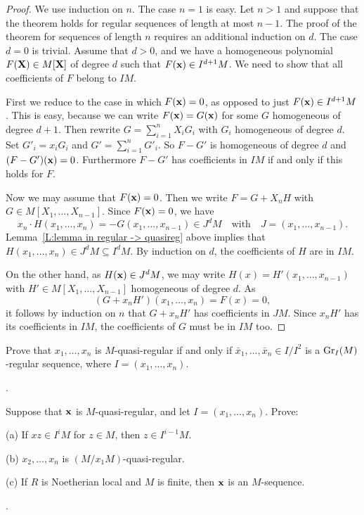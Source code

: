 	
	\begin{proof}
		We use induction on $n$. The case $n = 1$ is easy. Let $n > 1$ and suppose that the theorem holds for regular sequences of length at most $n-1$.
		The proof of the theorem for sequences of length $n$ requires an additional induction on $d$. The case $d = 0$ is trivial. Assume that $d > 0$, and we have a homogeneous polynomial $F(\mathbf{X}) \in M[\mathbf{X}]$ of degree $d$ such that $F(\mathbf{x}) \in I^{d+1}M$. We need to show that all coefficients of $F$ belong to $IM$.
		
		First we reduce to the case in which $F(\mathbf{x}) = 0$, as opposed to just $F(\mathbf{x}) \in I^{d+1}M$. This is easy, because we can write $F(\mathbf{x}) = G(\mathbf{x})$ for some $G$ homogeneous of degree $d+1$. Then rewrite $G = \sum_{i=1}^n X_iG_i$ with $G_i$ homogeneous of degree $d$. Set $G'_i = x_iG_i$ and $G' = \sum_{i=1}^n G'_i$. So $F - G'$ is homogeneous of degree $d$ and $(F - G')(\mathbf{x}) = 0$. Furthermore $F - G'$ has coefficients in $IM$ if and only if this holds for $F$.
		
		Now we may assume that $F(\mathbf{x}) = 0$. Then we write $F = G + X_nH$ with $G \in M[X_1, \dots, X_{n-1}]$.
		Since $F(\mathbf{x}) =0$, we have
		$$
		x_n \cdot H(x_1, \dots, x_n) = -G(x_1, \dots, x_{n-1}) \in J^d M \quad \textrm{with} \quad J = (x_1, \dots, x_{n-1}).
		$$
		Lemma~\ref{L:lemma in regular -> quasireg} above implies that $H(x_1, \dots,x_n) \in J^d M \subseteq I^d M$. By induction on $d$, the coefficients of $H$ are in $IM$.
		
		On the other hand, as $H(\mathbf{x}) \in J^dM$, we may write $H(x) = H'(x_1, \dots, x_{n-1})$ with $H' \in M[X_1, \dots, X_{n-1}]$ homogeneous of degree $d$. As
		\[(G + x_nH')(x_1, \dots, x_n) = F(x) = 0,\]
		it follows by induction on $n$ that $G + x_nH'$ has coefficients in $JM$. Since $x_nH'$ has its coefficients in $IM$, the coefficients of $G$ must be in $IM$ too.
	\end{proof}
	
	
	\begin{lemma}
		Prove that $x_1, \dots, x_n$ is $M$-quasi-regular if and only if $\bar x_1, \dots, \bar x_n\in I/I^2$ is a $\mathrm{Gr}_I(M)$-regular sequence, where $I = (x_1, \dots, x_n)$.
		
		\cite[Exercise 1.1.14]{BH}.
	\end{lemma}
	
	\begin{lemma}
		Suppose that $\mathbf{x}$ is $M$-quasi-regular, and let $I = (x_1, \dots, x_n)$. Prove:
		
		(a) If $xz \in I^i M$ for $z \in M$, then $z \in I^{i-1} M$.
		
		(b) $x_2, \dots, x_n$ is $(M/x_1 M)$-quasi-regular.
		
		(c) If $R$ is Noetherian local and $M$ is finite, then $\mathbf{x}$ is an $M$-sequence.
		
		
		\cite[Exercise 1.1.15]{BH}.
	\end{lemma}
	
